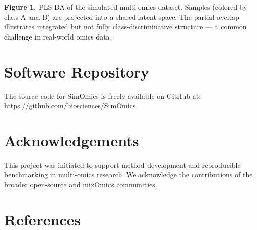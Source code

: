 \documentclass[
]{article}
\begin{document}
\textbf{Figure 1.} PLS-DA of the simulated multi-omics dataset. Samples
(colored by class A and B) are projected into a shared latent space. The
partial overlap illustrates integrated but not fully
class-discriminative structure --- a common challenge in real-world
omics data.

\section{Software Repository}\label{software-repository}

The source code for SimOmics is freely available on GitHub at:\\
\url{https://github.com/biosciences/SimOmics}

\section{Acknowledgements}\label{acknowledgements}

This project was initiated to support method development and
reproducible benchmarking in multi-omics research. We acknowledge the
contributions of the broader open-source and mixOmics communities.

\section*{References}\label{references}
\end{document}
